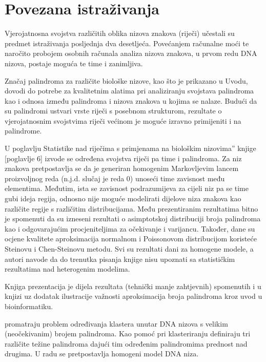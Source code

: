 \section{Povezana istraživanja}
\label{pal:sec:referencework}

Vjerojatnosna svojstva različitih oblika nizova znakova
(riječi) učestali su predmet istraživanja posljednja
dva desetljeća. Povećanjem računalne moći te naročito
probojem osobnih računala analiza nizova znakova,
u prvom redu DNA nizova, postaje moguća te time
i zanimljiva.

Značaj palindroma za različite biološke nizove,
kao što je prikazano u Uvodu, dovodi do potrebe
za kvalitetnim alatima pri analiziranju svojstava
palindroma kao i odnosa između palindroma i 
nizova znakova u kojima se nalaze. Budući
da su palindromi ustvari vrste riječi s posebnom
strukturom, rezultate o vjerojatnosnim svojstvima
riječi većinom je moguće izravno primijeniti
i na palindrome.

U poglavlju {\glqq}Statistike nad riječima s primjenama
na biološkim nizovima'' knjige 
\cite{lothaire_statistics_2005}[poglavlje 6]
izvode se određena svojstva riječi pa time i palindroma.
Za niz znakova pretpostavlja se da je generiran 
homogenim Markovljevim lancem proizvoljnog reda
(n.j.d. slučaj je reda 0)
unoseći time zavisnost među
elementima. Međutim, ista se zavisnost podrazumijeva
za cijeli niz pa se time gubi ideja regija, odnosno
nije moguće modelirati dijelove niza znakova kao
različite regije s različitim distribucijama.
Među prezentiranim rezultatima bitno je spomenuti
da su izneseni rezultati o asimptotskoj distribuciji
broja palindroma kao i odgovarajućim procjeniteljima
za očekivanje i varijancu. Također, dane su ocjene 
kvalitete aproksimacija normalnom i Poissonovom
distribucijom koristeće Steinovu i Chen-Steinovu
metodu. Svi su rezultati dani za homogene modele,
a autori navode da do trenutka pisanja knjige
nisu upoznati sa statističkim rezultatima
nad heterogenim modelima.

Knjiga \textcite{robin_dna_2005} prezentacija je dijela
rezultata (tehnički manje zahtjevnih) spomenutih i u 
knjizi \cite{lothaire_statistics_2005}
uz dodatak ilustracije važnosti aproksimacija broja
palindroma kroz uvod u bioinformatiku.

\textcite{chew_scoring_2005} promatraju problem
određivanja klastera unutar DNA nizova s velikim
(neočekivanim) brojem palindroma.
Kao pomoć pri klasteriranju definiraju tri
različite težine palindroma dajući tim
određenim palindromima prednost nad drugima.
U radu se pretpostavlja homogeni model DNA niza.


